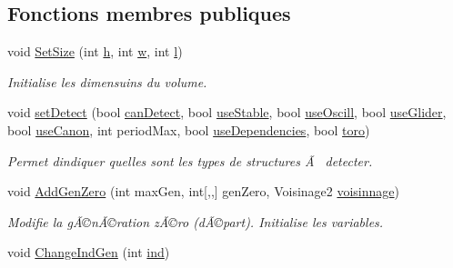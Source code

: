 \subsection*{Fonctions membres publiques}
\begin{DoxyCompactItemize}
\item 
void \mbox{\hyperlink{class_detection_a43ce2bcef47db14aa4a5a2ff39fee974}{Set\+Size}} (int \mbox{\hyperlink{class_detection_ae2432d029788c3aa58e832716a7832e4}{h}}, int \mbox{\hyperlink{class_detection_a15fdbc0a47657ec7c4bf5228a950079d}{w}}, int \mbox{\hyperlink{class_detection_a22ac4a8c7bfff75ddde6599e2868383d}{l}})
\begin{DoxyCompactList}\small\item\em Initialise les dimensuins du volume. \end{DoxyCompactList}\item 
void \mbox{\hyperlink{class_detection_a31fe39fdfc2f5b8c9e92bcfe1c5d6cc0}{set\+Detect}} (bool \mbox{\hyperlink{class_detection_a699901c5a7439b08e8ac5c36942bb61b}{can\+Detect}}, bool \mbox{\hyperlink{class_detection_a78bb8c89cca9479bb2bb4ef0f5e96945}{use\+Stable}}, bool \mbox{\hyperlink{class_detection_a9597ce1e1dea98c61902d891c1f1c7e0}{use\+Oscill}}, bool \mbox{\hyperlink{class_detection_af1181c7a5cdf8fe0f94e2e6526a1ffb1}{use\+Glider}}, bool \mbox{\hyperlink{class_detection_a3fe2d8aec9ad4e2a8f11902ba873db52}{use\+Canon}}, int period\+Max, bool \mbox{\hyperlink{class_detection_abe71ec7aa825173786fd273323343c11}{use\+Dependencies}}, bool \mbox{\hyperlink{class_detection_a2f87015f257584e33ceacc6d326fe5af}{toro}})
\begin{DoxyCompactList}\small\item\em Permet d\textquotesingle{}indiquer quelles sont les types de structures Ã  detecter. \end{DoxyCompactList}\item 
void \mbox{\hyperlink{class_detection_a96c6d9a8e299f137a4fb84d2ea80e092}{Add\+Gen\+Zero}} (int max\+Gen, int\mbox{[},,\mbox{]} gen\+Zero, Voisinage2 \mbox{\hyperlink{class_detection_a6f99794fd28f6f79dedfc541f8b78154}{voisinnage}})
\begin{DoxyCompactList}\small\item\em Modifie la gÃ©nÃ©ration zÃ©ro (dÃ©part). Initialise les variables. \end{DoxyCompactList}\item 
void \mbox{\hyperlink{class_detection_a70084049883e8e2ebecce5d24e84a196}{Change\+Ind\+Gen}} (int \mbox{\hyperlink{class_detection_ac2c7885d3e4d086504e66eb365207c1e}{ind}})

\end{DoxyCompactItemize}
